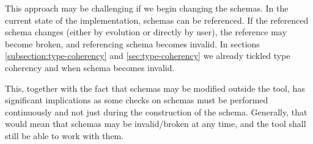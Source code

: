 This approach may be challenging if we begin changing the schemas. In the current state of the implementation, schemas can be referenced. If the referenced schema changes (either by evolution or directly by user), the reference may become broken, and referencing schema becomes invalid. In sections \ref{subsection:type-coherency} and \ref{sec:type-coherency} we already tickled type coherency and when schema becomes invalid.

This, together with the fact that schemas may be modified outside the tool, has significant implications as some checks on schemas must be performed continuously and not just during the construction of the schema. Generally, that would mean that schemas may be invalid/broken at any time, and the tool shall still be able to work with them.